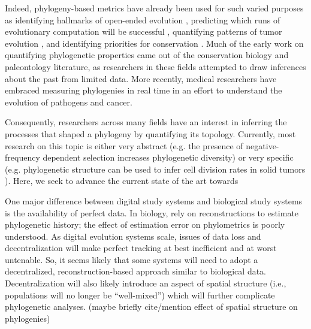 Indeed, phylogeny-based metrics have already been used for such varied purposes as identifying hallmarks of open-ended evolution \citep{dolsonMODESToolboxMeasurements2019}, predicting which runs of evolutionary computation will be successful \citep{hernandezWhatCanPhylogenetic2022a, shahbandeganUntanglingPhylogeneticDiversity2022a}, quantifying patterns of tumor evolution \citep{scottInferringTumorProliferative2020, lewinsohnStatedependentEvolutionaryModels2023}, and identifying priorities for conservation \citep{forestPreservingEvolutionaryPotential2007}. Much of the early work on quantifying phylogenetic properties came out of the conservation biology and paleontology literature, as researchers in these fields attempted to draw inferences about the past from limited data. More recently, medical researchers have embraced measuring phylogenies in real time in an effort to understand the evolution of pathogens and cancer. 

Consequently, researchers across many fields have an interest in inferring the processes that shaped a phylogeny by quantifying its topology. Currently, most research on this topic is either very abstract (e.g. the presence of negative-frequency dependent selection increases phylogenetic diversity) or very specific (e.g. phylogenetic structure can be used to infer cell division rates in solid tumors \citep{lewinsohnStatedependentEvolutionaryModels2023}). Here, we seek to advance the current state of the art towards 


One major difference between digital study systems and biological study systems is the availability of perfect data.
In biology, rely on reconstructions to estimate phylogenetic history; the effect of estimation error on phylometrics is poorly understood.
As digital evolution systems scale, issues of data loss and decentralization will make perfect tracking at best inefficient and at worst untenable.
So, it seems likely that some systems will need to adopt a decentralized, reconstruction-based approach similar to biological data.
Decentralization will also likely introduce an aspect of spatial structure (i.e., populations will no longer be ``well-mixed'') which will further complicate phylogenetic analyses.
(maybe briefly cite/mention effect of spatial structure on phylogenies)

